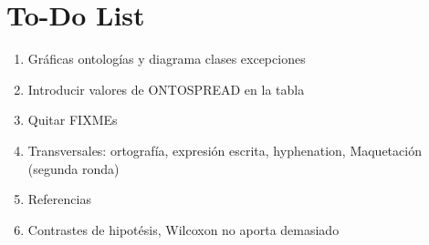 \chapter*{To-Do List}
\begin{enumerate}
 \item Gráficas ontologías y diagrama clases excepciones
 \item Introducir valores de ONTOSPREAD en la tabla
 \item Quitar FIXMEs
 \item Transversales: ortografía, expresión escrita, hyphenation, Maquetación (segunda ronda)
 \item Referencias
 \item Contrastes de hipotésis, Wilcoxon no aporta demasiado
\end{enumerate}
